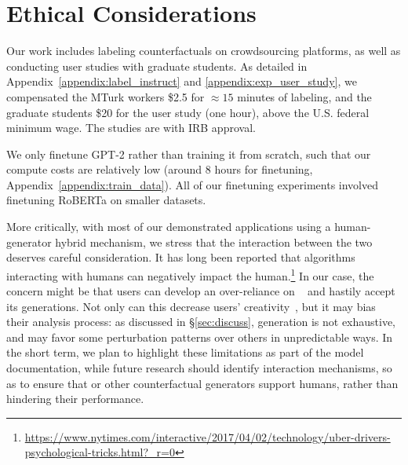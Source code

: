 
\section*{Ethical Considerations}
Our work includes labeling counterfactuals on crowdsourcing platforms, as well as conducting user studies with graduate students.
As detailed in Appendix~\ref{appendix:label_instruct} and \ref{appendix:exp_user_study}, we compensated the MTurk workers \$2.5 for ${\approx}15$ minutes of labeling, and the graduate students \$20 for the user study (one hour), above the U.S. federal minimum wage.
The studies are with IRB approval.

We only finetune GPT-2 rather than training it from scratch, such that our compute costs are relatively low (around 8 hours for finetuning, Appendix~\ref{appendix:train_data}). All of our finetuning experiments involved finetuning RoBERTa on smaller datasets.

More critically, with most of our demonstrated applications using a human-generator hybrid mechanism, we stress that the interaction between the two deserves careful consideration.
It has long been reported that algorithms interacting with humans can negatively impact the human.\footnote{\url{https://www.nytimes.com/interactive/2017/04/02/technology/uber-drivers-psychological-tricks.html?_r=0}}
In our case, the concern might be that users can develop an over-reliance on \sysname~\cite{bansal2021does} and hastily accept its generations.
Not only can this decrease users' creativity~\cite{green-etal-2014-human}, but it may bias their analysis process: as discussed in \S\ref{sec:discuss}, \sysname generation is not exhaustive, and may favor some perturbation patterns over others in unpredictable ways.
In the short term, we plan to highlight these limitations as part of the model documentation, while future research should identify interaction mechanisms, so as to ensure that \sysname or other counterfactual generators support humans, rather than hindering their performance.




